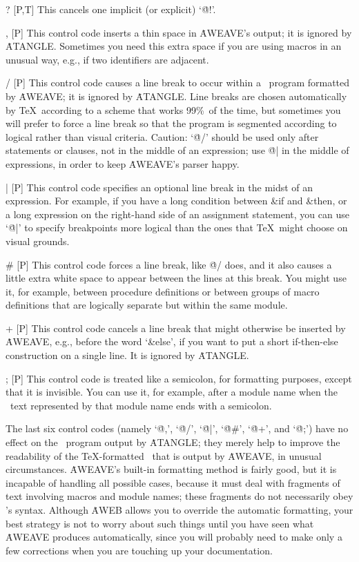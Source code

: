 \@? [P,T] This cancels one implicit (or explicit) `\.{@!}'. 
 
\@, [P] This control code inserts a thin space in \.{AWEAVE}'s output; it is
ignored by \.{ATANGLE}. Sometimes you need this extra space if you are using
macros in an unusual way, e.g., if two identifiers are adjacent.
 
\@/ [P] This control code causes a line break to occur within a \ADA\
program formatted by \.{AWEAVE}; it is ignored by \.{ATANGLE}. Line breaks
are chosen automatically by \TeX\ according to a scheme that works 99\%\
of the time, but sometimes you will prefer to force a line break so that
the program is segmented according to logical rather than visual criteria.
Caution: `\.{@/}' should be used only after statements or clauses, not in
the middle of an expression; use \.{@|} in the middle of expressions, in
order to keep \.{AWEAVE}'s parser happy.
 
\@| [P] This control code specifies an optional line break in the midst of
an expression. For example, if you have a long condition between \&{if} and
\&{then}, or a long expression on the right-hand side of an assignment
statement, you can use `\.{@|}' to specify breakpoints more logical than
the ones that \TeX\ might choose on visual grounds.
 
\@\# [P] This control code forces a line break, like \.{@/} does,
and it also causes a little extra white space to appear between the lines at
this break. You might use it, for example, between procedure definitions or
between groups of macro definitions that are logically separate but within
the same module.
 
\@+ [P] This control code cancels a line break that might otherwise be
inserted by \.{AWEAVE}, e.g., before the word `\&{else}', if you want to
put a short if-then-else construction on a single line. It is ignored by
\.{ATANGLE}.
 
\@; [P] This control code is treated like a semicolon, for formatting
purposes, except that it is invisible. You can use it, for example, after
a module name when the \ADA\ text represented by that module name ends
with a semicolon.
 
\yskip\noindent
The last six control codes (namely `\.{@,}', `\.{@/}', `\.{@|}',
`\.{@\#}', `\.{@+}', and `\.{@;}') have no effect on the \ADA\
program output by \.{ATANGLE}; they merely help to improve the readability
of the \TeX-formatted \ADA\ that is output by \.{AWEAVE}, in unusual
circumstances. \.{AWEAVE}'s built-in formatting method is fairly good, but
it is incapable of handling all possible cases, because it must deal with
fragments of text involving macros and module names; these fragments do
not necessarily obey \ADA's syntax. Although \.{AWEB} allows you to
override the automatic formatting, your best strategy is not to worry
about such things until you have seen what \.{AWEAVE} produces automatically,
since you will probably need to make only a few corrections when you are
touching up your documentation.
 
